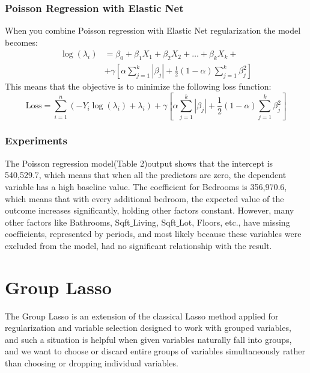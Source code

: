 \documentclass[a4paper, 9pt]{article}
\begin{document}
\begin{multicols}{2}
\subsubsection*{Poisson Regression with Elastic Net}
When you combine Poisson regression with Elastic Net regularization the model becomes:
\begin{equation}
\begin{split}
\log(\lambda_i)&=\beta_0+\beta_1X_1+\beta_2X_2+\dots+\beta_kX_k+ \\
&+\gamma \left[\alpha \sum_{j=1}^k|\beta_j| + \frac{1}{2}(1-\alpha)\sum_{j=1}^k\beta_{j}^{2} \right]
\end{split}
\end{equation}
This means that the objective is to minimize the following loss function:
\begin{equation*}
\text{Loss}=\sum_{i=1}^n(-Y_i \log(\lambda_i)+ \lambda_i)+ \gamma \left[\alpha \sum_{j=1}^k|\beta_j| + \frac{1}{2}(1-\alpha)\sum_{j=1}^k\beta_{j}^{2} \right]
\end{equation*}

\subsubsection*{Experiments}
The Poisson regression model(Table 2)output shows that the intercept is 540,529.7, which means that when all the predictors are zero, the dependent variable has a high baseline value. The coefficient for Bedrooms is 356,970.6, which means that with every additional bedroom, the expected value of the outcome increases significantly, holding other factors constant. However, many other factors like Bathrooms, Sqft$\_$Living, Sqft$\_$Lot, Floors, etc., have missing coefficients, represented by periods, and most likely because these variables were excluded from the model, had no significant relationship with the result.

\section{Group Lasso} \vspace{-7pt}
The Group Lasso is an extension of the classical Lasso method applied for regularization and variable selection designed to work with grouped variables, and such a situation is helpful when given variables naturally fall into groups, and we want to choose or discard entire groups of variables simultaneously rather than choosing or dropping individual variables.


\end{multicols}
\end{document}
